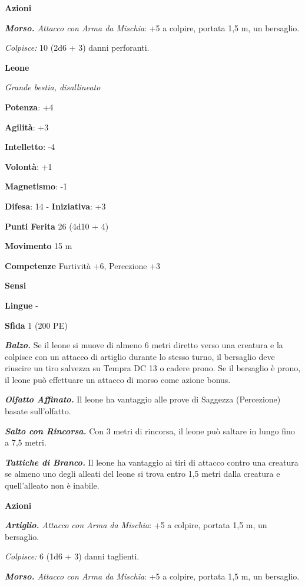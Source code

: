 \begin{multicols}{2}
\textbf{Azioni}

\emph{\textbf{Morso.} Attacco con Arma da Mischia}: +5 a colpire,
portata 1,5 m, un bersaglio.

\emph{Colpisce:} 10 (2d6 + 3) danni perforanti.



\textbf{Leone}

\emph{Grande bestia, disallineato}

\textbf{Potenza}: +4

\textbf{Agilità}: +3

\textbf{Intelletto}: -4

\textbf{Volontà}: +1

\textbf{Magnetismo}: -1

\textbf{Difesa}: 14 - \textbf{Iniziativa}: +3

\textbf{Punti Ferita} 26 (4d10 + 4)

\textbf{Movimento} 15 m

\textbf{Competenze} Furtività +6, Percezione +3

\textbf{Sensi} 

\textbf{Lingue} -

\textbf{Sfida} 1 (200 PE)

\emph{\textbf{Balzo.}} Se il leone si muove di almeno 6 metri diretto
verso una creatura e la colpisce con un attacco di artiglio durante lo
stesso turno, il bersaglio deve riuscire un tiro salvezza su Tempra DC 13
o cadere prono. Se il bersaglio è prono, il leone può effettuare un
attacco di morso come azione bonus.

\emph{\textbf{Olfatto Affinato.}} Il leone ha vantaggio alle prove di
Saggezza (Percezione) basate sull'olfatto.

\emph{\textbf{Salto con Rincorsa.}} Con 3 metri di rincorsa, il leone
può saltare in lungo fino a 7,5 metri.

\emph{\textbf{Tattiche di Branco.}} Il leone ha vantaggio ai tiri di
attacco contro una creatura se almeno uno degli alleati del leone si
trova entro 1,5 metri dalla creatura e quell'alleato non è inabile.

\textbf{Azioni}

\emph{\textbf{Artiglio.} Attacco con Arma da Mischia}: +5 a colpire,
portata 1,5 m, un bersaglio.

\emph{Colpisce:} 6 (1d6 + 3) danni taglienti.

\emph{\textbf{Morso.} Attacco con Arma da Mischia}: +5 a colpire,
portata 1,5 m, un bersaglio.


\end{multicols}
